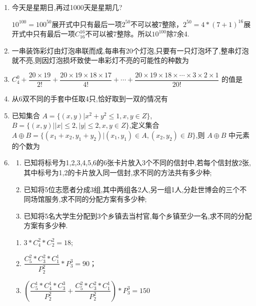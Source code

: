 \begin{enumerate}
\item 今天是星期日,再过1000天是星期几?
\begin{jieda}
    $10^{100}=100^{50}$展开式中只有最后一项$2^{50}$不可以被7整除，$2^{50}=4*(7+1)^{16}$展开式中只有最后一项$C^{16}_{16}$不可以被7整除。所以$10^{100}$除7余4.
\end{jieda}

\item 一串装饰彩灯由灯泡串联而成,每串有20个灯泡,只要有一只灯泡坏了,整串灯泡就不亮,则因灯泡损坏致使一串彩灯不亮的可能性的种数为

\item $C_{4}^{0}+\dfrac{20\times19}{2!}+\dfrac{20\times19\times18\times17}{4!}+\cdots+\dfrac{20\times19\times18\times\cdots\times3\times2\times1}{20!}$ 的值是

\item 从6双不同的手套中任取4只,恰好取到一双的情况有

\item 已知集合 $A=\{(x,y)|x^{2}+y^{2}\le1,x,y\in Z\}$, $B=\{(x,y)||x|\le2,|y|\le2,x,y\in Z\}$,定义集合 $A\oplus B=\{(x_{1}+x_{2},y_{1}+y_{2})|(x_{1},y_{1})\in A,(x_{2},y_{2})\in B\}$,则 $A\oplus B$ 中元素的个数为

\item 
\begin{enumerate}
\item 已知将标号为1,2,3,4,5,6的6张卡片放入3个不同的信封中,若每个信封放2张,其中标号为1,2的卡片放入同一信封,求不同的方法共有多少种;
\item 已知将5位志愿者分成3组,其中两组各2人,另一组1人,分赴世博会的三个不同场馆服务,求不同的分配方案有多少种;
\item 已知将5名大学生分配到3个乡镇去当村官,每个乡镇至少一名,求不同的分配方案有多少种.
\end{enumerate}
\begin{jieda}
    \begin{enumerate}
        \item $3*C^2_4*C^2_2=18$;
        \item 
        $\dfrac{C^2_5*C^2_3*C^1_1}{P^2_2}*P^3_3=90$；
        \item 
        $(\dfrac{C^1_5*C^1_4*C^3_3}{P^2_2}+\dfrac{C^2_5*C^2_3*C^1_1}{P^2_2})*P^3_3=150$
    \end{enumerate}
\end{jieda}




\end{enumerate}
